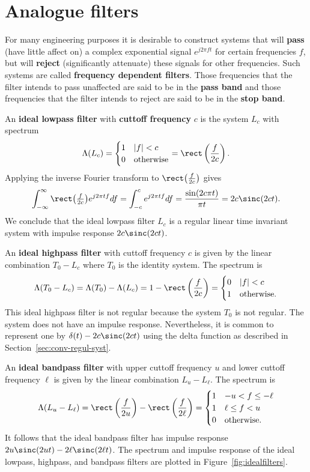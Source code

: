 \documentclass[11pt,a4paper]{book}
\theoremstyle{plain}
\numberwithin{equation}{section}
\newcommand{\term}{\textbf}
\newcommand{\abs}[1]{\left\vert #1 \right\vert}
\begin{document}
\section{Analogue filters} \label{sec:analogue-filters}


For many engineering purposes it is desirable to construct systems that will \term{pass} (have little affect on) a complex exponential signal $e^{j2\pi f t}$ for certain frequencies $f$, but will \term{reject} (significantly attenuate) these signals for other frequencies.  Such systems are called \term{frequency dependent filters}.  Those frequencies that the filter intends to pass unaffected are said to be in the \term{pass band} and those frequencies that the filter intends to reject are said to be in the \term{stop band}.

An \term{ideal lowpass filter} with \term{cuttoff frequency} $c$ is the system $L_c$ with spectrum
\[
\Lambda(L_c) = \begin{cases}
1 & \abs{f} < c \\
0 & \text{otherwise}
\end{cases}
= \rect\left(\frac{f}{2c}\right).
\]
Applying the inverse Fourier transform to $\rect\big(\tfrac{f}{2c}\big)$ gives
\[
\int_{-\infty}^\infty \rect\big(\tfrac{f}{2c}\big) e^{j2\pi t f} df = \int_{-c}^c e^{j2\pi t f} df = \frac{\sin(2 c\pi t)}{\pi t} = 2c\sinc(2ct).
\]
We conclude that the ideal lowpass filter $L_c$ is a regular linear time invariant system with impulse response $2c\sinc(2ct)$.

An \term{ideal highpass filter} with cuttoff frequency $c$ is given by the linear combination $T_0 - L_c$ where $T_0$ is the identity system.  The spectrum is
\[
\Lambda(T_0 - L_c) = \Lambda(T_0) - \Lambda(L_c)  = 1 - \rect\left(\frac{f}{2c}\right) = \begin{cases}
0 &  \abs{f} < c \\
1 & \text{otherwise}.
\end{cases}
\]
This ideal highpass filter is not regular because the system $T_0$ is not regular.  The system does not have an impulse response.  Nevertheless, it is common to represent one by $\delta(t) - 2c\sinc(2ct)$ using the delta function as described in Section~\ref{sec:conv-regul-syst}.

An \term{ideal bandpass filter} with upper cuttoff frequency $u$ and lower cuttoff frequency $\ell$ is given by the linear combination $L_u - L_\ell$.  The spectrum is
\[
\Lambda(L_u - L_\ell) = \rect\left(\frac{f}{2u}\right) - \rect\left(\frac{f}{2\ell}\right) = \begin{cases}
1 &  -u < f \leq -\ell \\
1 &  \ell \leq f < u \\
0 & \text{otherwise}.
\end{cases}
\]
It follows that the ideal bandpass filter has impulse response $2u\sinc(2ut) - 2\ell\sinc(2\ell t)$.  The spectrum and impulse response of the ideal lowpass, highpass, and bandpass filters are plotted in Figure~\ref{fig:idealfilters}.
\end{document}
